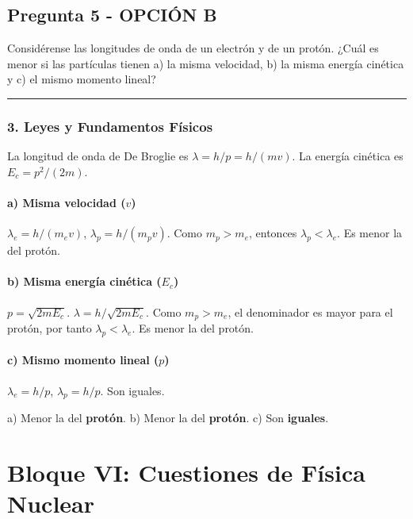 \newpage

\subsection{Pregunta 5 - OPCIÓN B}
\label{subsec:5B_2004_jun_ord}

\begin{cajaenunciado}
Considérense las longitudes de onda de un electrón y de un protón. ¿Cuál es menor si las partículas tienen a) la misma velocidad, b) la misma energía cinética y c) el mismo momento lineal?
\end{cajaenunciado}
\hrule

\subsubsection*{3. Leyes y Fundamentos Físicos}
La longitud de onda de De Broglie es $\lambda = h/p = h/(mv)$. La energía cinética es $E_c = p^2/(2m)$.
\paragraph*{a) Misma velocidad ($v$)}
$\lambda_e = h/(m_e v)$, $\lambda_p = h/(m_p v)$. Como $m_p > m_e$, entonces $\lambda_p < \lambda_e$. Es menor la del protón.
\paragraph*{b) Misma energía cinética ($E_c$)}
$p = \sqrt{2mE_c}$. $\lambda = h/\sqrt{2mE_c}$. Como $m_p > m_e$, el denominador es mayor para el protón, por tanto $\lambda_p < \lambda_e$. Es menor la del protón.
\paragraph*{c) Mismo momento lineal ($p$)}
$\lambda_e = h/p$, $\lambda_p = h/p$. Son iguales.
\begin{cajaresultado}
a) Menor la del \textbf{protón}. b) Menor la del \textbf{protón}. c) Son \textbf{iguales}.
\end{cajaresultado}

\newpage

\section{Bloque VI: Cuestiones de Física Nuclear}
\label{sec:nuclear_2004_jun_ord}

